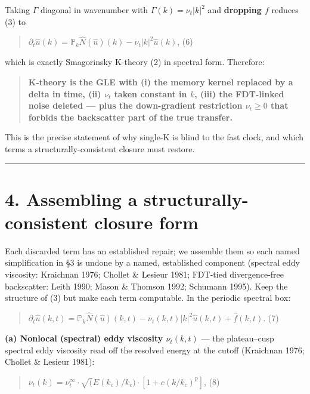 \documentclass[11pt]{article}
\begin{document}
Taking $\Gamma $ diagonal in wavenumber with $\Gamma (k)=\nu _{t}|k|^{2}$ and \textbf{dropping $f$} reduces (3) to


\begin{quote}
$\partial _{t}\hat{u}(k) = \mathbb{P}_{k} \hat{N}(\hat{u})(k) - \nu _{t}|k|^{2} \hat{u}(k)$, (6)
\end{quote}


which is exactly Smagorinsky K-theory (2) in spectral form. Therefore:


\begin{quote}
\textbf{K-theory is the GLE with (i) the memory kernel replaced by a delta in time, (ii) $\nu _{t}$ taken constant in $k$, (iii) the FDT-linked noise deleted — plus the down-gradient restriction $\nu _{t}\ge 0$ that forbids the backscatter part of the true transfer.}
\end{quote}


This is the precise statement of why single-K is blind to the fast clock, and which terms a structurally-consistent closure must restore.


\medskip\hrule\medskip


\section*{4. Assembling a structurally-consistent closure form}


Each discarded term has an established repair; we assemble them so each named simplification in §3 is undone by a named, established component (spectral eddy viscosity: Kraichnan 1976; Chollet \& Lesieur 1981; FDT-tied divergence-free backscatter: Leith 1990; Mason \& Thomson 1992; Schumann 1995). Keep the structure of (3) but make each term computable. In the periodic spectral box:


\begin{quote}
$\partial _{t}\hat{u}(k,t) = \mathbb{P}_{k} \hat{N}(\hat{u})(k,t) - \nu _{t}(k,t)|k|^{2} \hat{u}(k,t) + \hat{f}(k,t)$. (7)
\end{quote}


\textbf{(a) Nonlocal (spectral) eddy viscosity $\nu _{t}(k,t)$} — the plateau–cusp spectral eddy viscosity read off the resolved energy at the cutoff (Kraichnan 1976; Chollet \& Lesieur 1981):


\begin{quote}
$\nu _{t}(k) = \nu _{t}^\infty  \cdot  \surd (E(k_{c})/k_{c}) \cdot  [1 + c(k/k_{c})^{p}]$, (8)
\end{quote}
\end{document}
